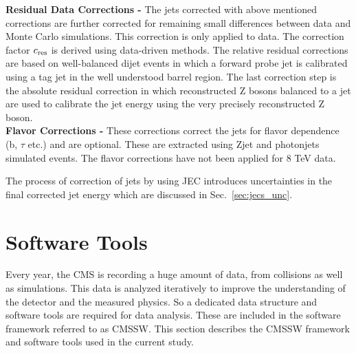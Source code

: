{\bf Residual Data Corrections -} The jets corrected with above mentioned corrections are further corrected for remaining small differences between data and Monte Carlo simulations. This correction is only applied to data. The correction factor $c_{\rm res}$ is derived using data-driven methods. The relative residual corrections are based on well-balanced dijet events in which a forward probe jet is calibrated using a tag jet in the well understood barrel region. The last correction step is the absolute residual correction in which reconstructed Z bosons balanced to a jet are used to calibrate the jet energy using the very precisely reconstructed Z boson. \\ \newline
{\bf Flavor Corrections -} These corrections correct the jets for flavor dependence (b, $\tau$ etc.) and are optional. These are extracted using Z\plusn jet and photon\plusn jets simulated events. The flavor corrections have not been applied for 8 TeV data.

The process of correction of jets by using JEC introduces uncertainties in the final corrected jet energy which are discussed in Sec.~\ref{sec:jecs_unc}.

\section{Software Tools}
Every year, the CMS is recording a huge amount of data, from collisions as well as simulations. This data is analyzed iteratively to improve the understanding of the detector and the measured physics. So a dedicated data structure and software tools are required for data analysis. These are included in the software framework referred to as CMSSW. This section describes the CMSSW framework and software tools used in the current study.

